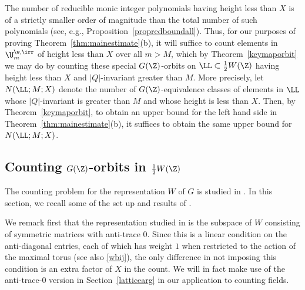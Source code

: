 The number of reducible monic integer
polynomials having height less than $X$ is of a strictly smaller order
of magnitude than the total number of such polynomials (see, e.g.,
Proposition~\ref{propredboundall}).  Thus, for our purposes of proving
Theorem~\ref{thm:mainestimate}(b), it will suffice to count elements
in $\U_m^{\w,\irr}$ of height less than $X$ over all $m>M$, which by
Theorem~\ref{keymaporbit} we may do by counting these special
$G(\Z)$-orbits on $\LL\subset \frac12W(\Z)$ having height less than
$X$ and $|Q|$-invariant greater than $M$.  More precisely, let
$N(\LL;M;X)$ denote the number of $G(\Z)$-equivalence classes of
elements in $\LL$ whose $|Q|$-invariant is greater than $M$ and whose
height is less than $X$.  Then, by Theorem~\ref{keymaporbit}, to
obtain an upper bound for the left hand side in
Theorem~\ref{thm:mainestimate}(b), it suffices to obtain the same
upper bound for $N(\LL;M;X)$.

\subsection{Counting $G(\Z)$-orbits in $\frac12W(\Z)$}

The counting problem for the representation $W$ of $G$ is studied in
\cite{BG2}. In this section, we recall some of the set up and results
of \cite{BG2}.

We remark first that the representation studied in \cite{BG2} is the
subspace of $W$ consisting of symmetric matrices with anti-trace
$0$. Since this is a linear condition on the anti-diagonal entries,
each of which has weight $1$ when restricted to the action of the
maximal torus (see also \eqref{wbij}), the only difference in not
imposing this condition is an extra factor of $X$ in the count. We
will in fact make use of the anti-trace-$0$ version in Section~\ref{latticearg} in our
application to counting fields.

